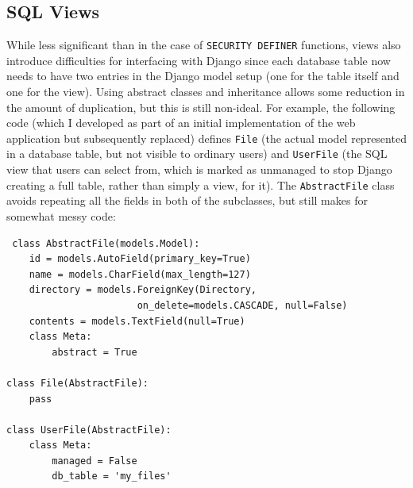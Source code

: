 \documentclass[12pt]{report}
\begin{document}
\subsection{SQL Views}
While less significant than in the case of \texttt{SECURITY DEFINER} functions, views also introduce difficulties for interfacing with Django since each database table now needs to have two entries in the Django model setup (one for the table itself and one for the view). Using abstract classes and inheritance allows some reduction in the amount of duplication, but this is still non-ideal. For example, the following code (which I developed as part of an initial implementation of the web application but subsequently replaced) defines \texttt{File} (the actual model represented in a database table, but not visible to ordinary users) and \texttt{UserFile} (the SQL view that users can select from, which is marked as unmanaged to stop Django creating a full table, rather than simply a view, for it). The \texttt{AbstractFile} class avoids repeating all the fields in both of the subclasses, but still makes for somewhat messy code:

\begin{verbatim}
 class AbstractFile(models.Model):
    id = models.AutoField(primary_key=True)
    name = models.CharField(max_length=127)
    directory = models.ForeignKey(Directory,
                       on_delete=models.CASCADE, null=False)
    contents = models.TextField(null=True)
    class Meta:
        abstract = True

class File(AbstractFile):
    pass

class UserFile(AbstractFile):
    class Meta:
        managed = False
        db_table = 'my_files'
\end{verbatim}
\end{document}

